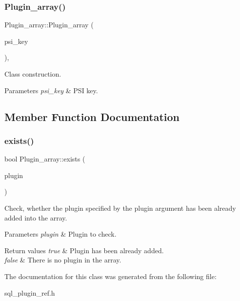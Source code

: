 \subsubsection{\texorpdfstring{Plugin\+\_\+array()}{Plugin\_array()}}
{\footnotesize\ttfamily Plugin\+\_\+array\+::\+Plugin\+\_\+array (\begin{DoxyParamCaption}\item[{P\+S\+I\+\_\+memory\+\_\+key}]{psi\+\_\+key }\end{DoxyParamCaption})\hspace{0.3cm}{\ttfamily [inline]}, {\ttfamily [explicit]}}

Class construction.


\begin{DoxyParams}{Parameters}
{\em psi\+\_\+key} & P\+SI key. \\
\hline
\end{DoxyParams}


\subsection{Member Function Documentation}
\mbox{\label{classPlugin__array_a48e49d3d735dda412b27b17c2f05c1f9}} 
\subsubsection{\texorpdfstring{exists()}{exists()}}
{\footnotesize\ttfamily bool Plugin\+\_\+array\+::exists (\begin{DoxyParamCaption}\item[{\mbox{\hyperlink{structst__plugin__int}{plugin\+\_\+ref}}}]{plugin }\end{DoxyParamCaption})\hspace{0.3cm}{\ttfamily [inline]}}

Check, whether the plugin specified by the plugin argument has been already added into the array.


\begin{DoxyParams}{Parameters}
{\em plugin} & Plugin to check.\\
\hline
\end{DoxyParams}

\begin{DoxyRetVals}{Return values}
{\em true} & Plugin has been already added. \\
\hline
{\em false} & There is no plugin in the array. \\
\hline
\end{DoxyRetVals}


The documentation for this class was generated from the following file\+:\begin{DoxyCompactItemize}
\item 
sql\+\_\+plugin\+\_\+ref.\+h\end{DoxyCompactItemize}
